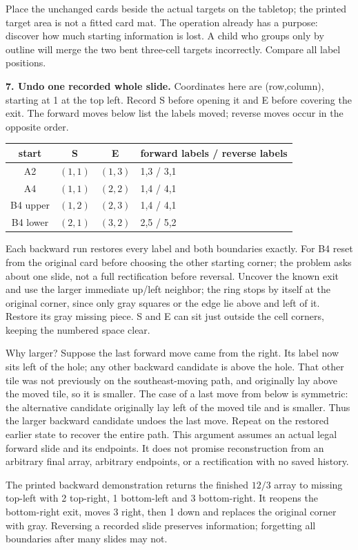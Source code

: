 \documentclass[11pt]{article}
\begin{document}
Place the unchanged cards beside the actual targets on the tabletop; the printed target area is not a fitted card mat. The operation already has a purpose: discover how much starting information is lost. A child who groups only by outline will merge the two bent three-cell targets incorrectly. Compare all label positions.

\textbf{7. Undo one recorded whole slide.} Coordinates here are (row,column), starting at 1 at the top left. Record S before opening it and E before covering the exit. The forward moves below list the labels moved; reverse moves occur in the opposite order.
\begin{center}\begin{tabular}{cccl}\toprule
start&S&E&forward labels / reverse labels\\\midrule
A2&$(1,1)$&$(1,3)$&1,3 / 3,1\\
A4&$(1,1)$&$(2,2)$&1,4 / 4,1\\
B4 upper&$(1,2)$&$(2,3)$&1,4 / 4,1\\
B4 lower&$(2,1)$&$(3,2)$&2,5 / 5,2\\\bottomrule
\end{tabular}\end{center}
Each backward run restores every label and both boundaries exactly. For B4 reset from the original card before choosing the other starting corner; the problem asks about one slide, not a full rectification before reversal. Uncover the known exit and use the larger immediate up/left neighbor; the ring stops by itself at the original corner, since only gray squares or the edge lie above and left of it. Restore its gray missing piece. S and E can sit just outside the cell corners, keeping the numbered space clear.

Why larger? Suppose the last forward move came from the right. Its label now sits left of the hole; any other backward candidate is above the hole. That other tile was not previously on the southeast-moving path, and originally lay above the moved tile, so it is smaller. The case of a last move from below is symmetric: the alternative candidate originally lay left of the moved tile and is smaller. Thus the larger backward candidate undoes the last move. Repeat on the restored earlier state to recover the entire path. This argument assumes an actual legal forward slide and its endpoints. It does not promise reconstruction from an arbitrary final array, arbitrary endpoints, or a rectification with no saved history.

The printed backward demonstration returns the finished $12/3$ array to missing top-left with 2 top-right, 1 bottom-left and 3 bottom-right. It reopens the bottom-right exit, moves 3 right, then 1 down and replaces the original corner with gray. Reversing a recorded slide preserves information; forgetting all boundaries after many slides may not.
\end{document}
